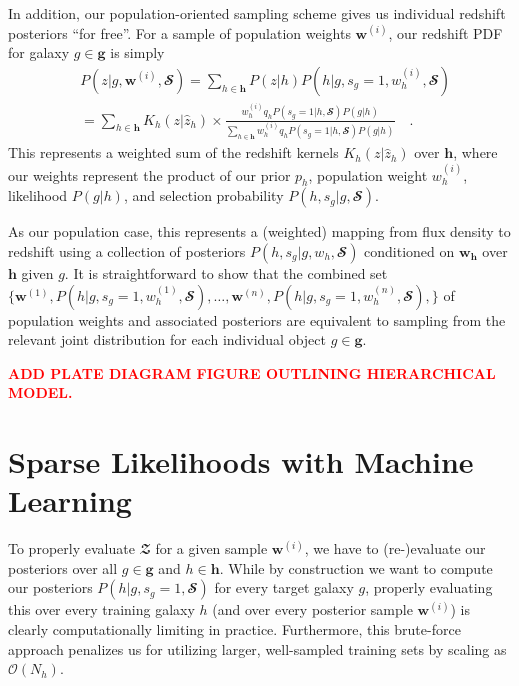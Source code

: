 \documentclass[a4paper,fleqn,usenatbib,english]{mnras}
\newcommand{\josh}[1]{\textcolor{red}{\textbf{#1}}}
\begin{document}
In addition, our population-oriented sampling scheme gives us individual redshift posteriors ``for free''. For a sample of population weights $\mathbf{w}^{(i)}$, our redshift PDF for galaxy $g \in \mathbf{g}$ is simply
\begin{align}
&P(z|g,\mathbf{w}^{(i)},\mathbfcal{S}) = \sum_{h\in\mathbf{h}} P(z|h) P(h|g,s_g=1,w_h^{(i)},\mathbfcal{S}) \nonumber \\
&= \sum_{h \in \mathbf{h}} K_h(z|\hat{z}_h) \times \frac{w_h^{(i)} q_h P(s_g=1|h,\mathbfcal{S}) P(g|h)}{\sum_{h \in \mathbf{h}} w_h^{(i)} q_h P(s_g=1|h,\mathbfcal{S}) P(g|h)} \quad .
\end{align}
This represents a weighted sum of the redshift kernels $K_h(z|\hat{z}_h)$ over $\mathbf{h}$, where our weights represent the product of our prior $p_h$, population weight $w_h^{(i)}$, likelihood $P(g|h)$, and selection probability $P(h,s_g|g,\mathbfcal{S})$.

As our population case, this represents a (weighted) mapping from flux density to redshift using a collection of posteriors $P(h,s_g|g,w_h,\mathbfcal{S})$ conditioned on $\mathbf{w_h}$ over $\mathbf{h}$ given $g$. It is straightforward to show that the combined set $\lbrace \mathbf{w}^{(1)},P(h|g,s_g=1,w_h^{(1)},\mathbfcal{S}), \ldots, \mathbf{w}^{(n)},P(h|g,s_g=1,w_h^{(n)},\mathbfcal{S}), \rbrace$ of population weights and associated posteriors are equivalent to sampling from the relevant joint distribution for each individual object $g \in \mathbf{g}$.

\josh{ADD PLATE DIAGRAM FIGURE OUTLINING HIERARCHICAL MODEL.}


\section{Sparse Likelihoods with Machine Learning}
\label{sec:ml_like}

To properly evaluate $\mathbfcal{Z}$ for a given sample $\mathbf{w}^{(i)}$, we have to (re-)evaluate our posteriors over all $g \in \mathbf{g}$ and $h \in \mathbf{h}$. While by construction we want to compute our posteriors $P(h|g,s_g=1,\mathbfcal{S})$ for every target galaxy $g$, properly evaluating this over every training galaxy $h$ (and over every posterior sample $\mathbf{w}^{(i)}$) is clearly computationally limiting in practice. Furthermore, this brute-force approach penalizes us for utilizing larger, well-sampled training sets by scaling as $\mathcal{O}(N_h)$.
\end{document}
